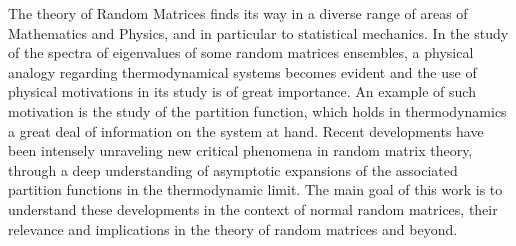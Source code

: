 The theory of Random Matrices finds its way in a diverse range of areas of Mathematics and Physics, and in particular to statistical mechanics. In the study of the spectra of eigenvalues of some random matrices ensembles, a physical analogy regarding thermodynamical systems becomes evident and the use of physical motivations in its study is of great importance. An example of such motivation is the study of the partition function, which holds in thermodynamics a great deal of information on the system at hand. Recent developments have been intensely unraveling new critical phenomena in random matrix theory, through a deep understanding of asymptotic expansions of the associated partition functions in the thermodynamic limit. The main goal of this work is to understand these developments in the context of normal random matrices, their relevance and implications in the theory of random matrices and beyond.
